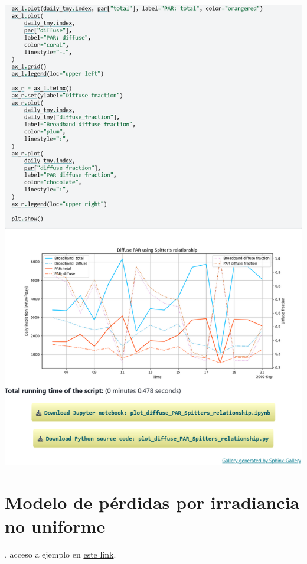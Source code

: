 \begin{myparindent}{0pt}
\includegraphics[width=\linewidth,height=0.9\textheight,keepaspectratio]{images/docs_examples_cut/spitters_2.png}

\newpage\section{Modelo de pérdidas por irradiancia no uniforme} \label{sct:doc_ej_modelo_ajuste_no_uniformidad}

, acceso a ejemplo en \href{https://pvlib-python.readthedocs.io/en/latest/gallery/bifacial/plot_irradiance_nonuniformity_loss.html}{este link}.


\end{myparindent}
